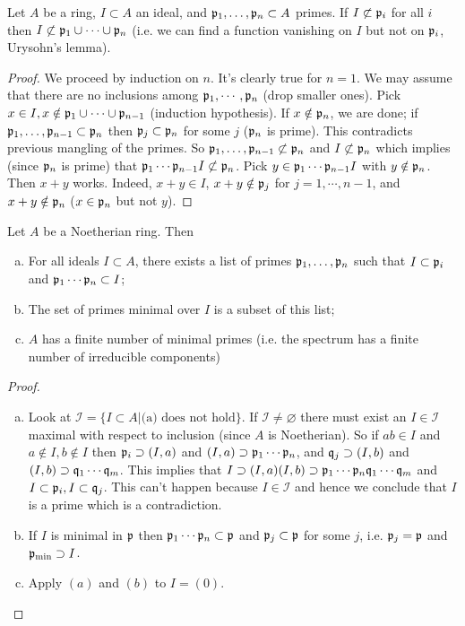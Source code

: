 \documentclass{../mathnotes}
\begin{document}
\begin{lem}
\label{L39}
Let $A$ be a ring, $I\subset A$ an ideal, and $\mathfrak p_1,\ldots,\mathfrak p_n\subset A$ primes. If $I\not\subset\mathfrak p_i$ for all $i$ then $I\not\subset\mathfrak p_1\cup\cdots\cup\mathfrak p_n$ (i.e. we can find a function vanishing on $I$ but not on $\mathfrak p_i$, Urysohn's lemma).
\end{lem}
\begin{proof}
We proceed by induction on $n$. It's clearly true for $n=1$. We may assume that there are no inclusions among $\mathfrak p_1,\cdots,\mathfrak p_n$ (drop smaller ones). Pick $x\in I,x\notin\mathfrak p_1\cup\cdots\cup\mathfrak p_{n-1}$ (induction hypothesis). If $x\notin\mathfrak p_n$, we are done; if $\mathfrak p_1,\ldots,\mathfrak p_{n-1}\subset\mathfrak p_n$ then $\mathfrak p_j\subset\mathfrak p_n$ for some $j$ ($\mathfrak p_n$ is prime). This contradicts previous mangling of the primes. So $\mathfrak p_1,\ldots,\mathfrak p_{n-1}\not\subset\mathfrak p_n$ and $I\not\subset\mathfrak p_n$ which implies (since $\mathfrak p_n$ is prime) that $\mathfrak p_1\cdots \mathfrak p_{n-1}I\not\subset\mathfrak p_n$. Pick $y\in\mathfrak p_1\cdots\mathfrak p_{n-1}I$ with $y\notin\mathfrak p_n$. Then $x+y$ works. Indeed, $x+y\in I$, $x+y\notin\mathfrak p_j$ for $j=1,\cdots,n-1$, and $x+y\notin\mathfrak p_n$ ($x\in\mathfrak p_n$ but not $y$).
\end{proof}

\begin{lem}
\label{L40}
Let $A$ be a Noetherian ring. Then
\begin{enumerate}[(a)]
\item For all ideals $I\subset A$, there exists a list of primes $\mathfrak p_1,\ldots, \mathfrak p_n$ such that $I\subset\mathfrak p_i$ and $\mathfrak p_1\cdots\mathfrak p_n\subset I$;
\item The set of primes minimal over $I$ is a subset of this list;
\item $A$ has a finite number of minimal primes (i.e. the spectrum has a finite number of irreducible components)
\end{enumerate}
\end{lem}
\begin{proof}\hspace{1mm}
\begin{enumerate}[(a)]
\item Look at $\mathcal{I}=\{I\subset A | \text{(a) does not hold}\}$. If $\mathcal{I}\neq\varnothing$ there must exist an $I\in\mathcal{I}$ maximal with respect to inclusion (since $A$ is Noetherian). So if $ab\in I$ and $a\notin I,b\notin I$ then $\mathfrak p_i\supset(I,a)$ and $(I,a)\supset\mathfrak p_1\cdots\mathfrak p_n$, and $\mathfrak q_j\supset(I,b)$ and $(I,b)\supset\mathfrak q_1\cdots\mathfrak q_m$. This implies that $I\supset(I,a)(I,b)\supset\mathfrak p_1\cdots\mathfrak p_n\mathfrak q_1\cdots\mathfrak q_m$ and $I\subset\mathfrak p_i,I\subset\mathfrak q_j$. This can't happen because $I\in\mathcal{I}$ and hence we conclude that $I$ is a prime which is a contradiction.
\item If $I$ is minimal in $\mathfrak p$ then $\mathfrak p_1\cdots\mathfrak p_n\subset\mathfrak p$ and $\mathfrak p_j\subset \mathfrak p$ for some $j$, i.e. $\mathfrak p_j=\mathfrak p$ and $\mathfrak p_{\text{min}}\supset I$.
\item Apply $(a)$ and $(b)$ to $I=(0)$.
\end{enumerate}
\end{proof}
\end{document}
